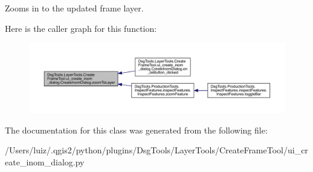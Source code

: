 \begin{DoxyVerb}Zooms in to the updated frame layer.
\end{DoxyVerb}
 Here is the caller graph for this function\+:
\nopagebreak
\begin{figure}[H]
\begin{center}
\leavevmode
\includegraphics[width=350pt]{class_dsg_tools_1_1_layer_tools_1_1_create_frame_tool_1_1ui__create__inom__dialog_1_1_create_inom_dialog_af10b5ebe354f1a4c9c5d3b0e59bcaa27_icgraph}
\end{center}
\end{figure}


The documentation for this class was generated from the following file\+:\begin{DoxyCompactItemize}
\item 
/\+Users/luiz/.\+qgis2/python/plugins/\+Dsg\+Tools/\+Layer\+Tools/\+Create\+Frame\+Tool/ui\+\_\+create\+\_\+inom\+\_\+dialog.\+py\end{DoxyCompactItemize}
